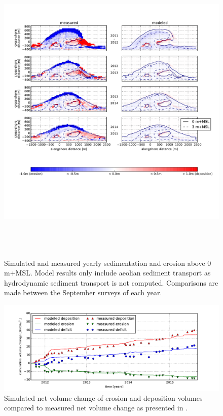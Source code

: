 \begin{figure}
  \centering
  \includegraphics[height=15cm, angle=90]{../Figures/model_sedero}
  \caption{Simulated and measured yearly sedimentation and erosion
    above 0 m+MSL. Model results only include aeolian sediment
    transport as hydrodynamic sediment transport is not
    computed. Comparisons are made between the September surveys of
    each year.}
  \label{fig:sedero_model}
\end{figure}

\begin{figure}
  \centering
\includegraphics[width=\columnwidth]{../Figures/model_volumes_ts}
\caption{Simulated net volume change of erosion and deposition volumes
  compared to measured net volume change as presented in
  \citet{Hoonhout2017a}.}
  \label{fig:netvolumechange_model}
\end{figure}

